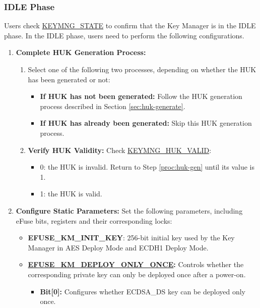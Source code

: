 \documentclass[main\_\_EN.tex]{subfiles}
\begin{document}
\subsubsection{IDLE Phase}

Users check \hyperref[fielddesc:KEYMNGSTATE]{KEYMNG\_STATE} to confirm that the Key Manager is in the IDLE phase. In the IDLE phase, users need to perform the following configurations.
\begin{enumerate}
    \item \textbf{Complete HUK Generation Process:}
    \begin{enumerate}
        \item Select one of the following two processes, depending on whether the HUK has been generated or not:
        \label{proc:huk-gen}
        \begin{itemize}
            \item \textbf{If HUK has not been generated:} Follow the HUK generation process described in Section \ref{sec:huk-generate}.
            \item \textbf{If HUK has already been generated:} Skip this HUK generation process.
        \end{itemize}
        \item \textbf{Verify HUK Validity:} Check  \hyperref[fielddesc:KEYMNGHUKVALID]{KEYMNG\_HUK\_VALID}:
        \begin{itemize}
            \item 0: the HUK is invalid. Return to Step \ref{proc:huk-gen} until its value is 1.
            \item 1: the HUK is valid.
        \end{itemize}
    \end{enumerate}
    \item \textbf{Configure Static Parameters:} Set the following parameters, including eFuse bits, registers and their corresponding locks:
    \begin{itemize}
        \item \textbf{EFUSE\_KM\_INIT\_KEY}: 256-bit initial key used by the Key Manager in AES Deploy Mode and ECDH1 Deploy Mode.
        \item \textbf{\hyperref[fielddesc:EFUSEKMDEPLOYONLYONCE]{EFUSE\_KM\_DEPLOY\_ONLY\_ONCE}:} Controls whether the corresponding private key can only be deployed once after a power-on.
        \begin{itemize}
            \item \textbf{Bit[0]:} Configures whether ECDSA\_DS key can be deployed only once.

\end{itemize}
\end{itemize}
\end{enumerate}
\end{document}
